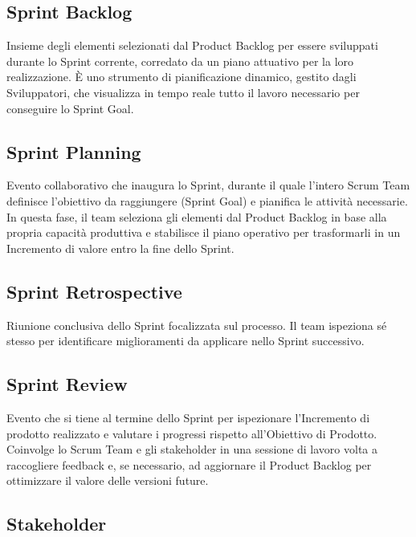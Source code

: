 \documentclass[a4paper, 11pt, oneside]{scrartcl} %
\begin{document}
\subsection*{Sprint Backlog}
Insieme degli elementi selezionati dal Product Backlog per essere sviluppati durante lo Sprint corrente, corredato da un piano attuativo per la loro realizzazione. È uno strumento di pianificazione dinamico, gestito dagli Sviluppatori, che visualizza in tempo reale tutto il lavoro necessario per conseguire lo Sprint Goal.
\vspace{0.5cm}

\subsection*{Sprint Planning}
Evento collaborativo che inaugura lo Sprint, durante il quale l'intero Scrum Team definisce l'obiettivo da raggiungere (Sprint Goal) e pianifica le attività necessarie. In questa fase, il team seleziona gli elementi dal Product Backlog in base alla propria capacità produttiva e stabilisce il piano operativo per trasformarli in un Incremento di valore entro la fine dello Sprint.
\vspace{0.5cm}

\subsection*{Sprint Retrospective}
Riunione conclusiva dello Sprint focalizzata sul processo. Il team ispeziona sé stesso per identificare miglioramenti da applicare nello Sprint successivo.
\vspace{0.5cm}

\subsection*{Sprint Review}
Evento che si tiene al termine dello Sprint per ispezionare l'Incremento di prodotto realizzato e valutare i progressi rispetto all'Obiettivo di Prodotto. Coinvolge lo Scrum Team e gli stakeholder in una sessione di lavoro volta a raccogliere feedback e, se necessario, ad aggiornare il Product Backlog per ottimizzare il valore delle versioni future.
\vspace{0.5cm}


\subsection*{Stakeholder}
\end{document}
